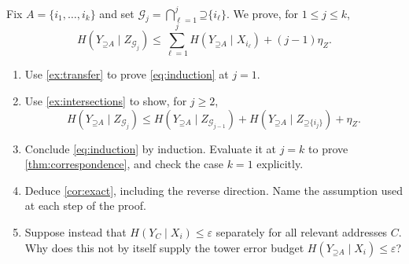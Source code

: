 \documentclass[11pt]{article}
\newcommand{\Up}{\mathord{\supseteq}}
\begin{document}
\begin{exercise}
\label{ex:induction}\important
Fix $A=\{i_1,\ldots,i_k\}$ and set
$\mathcal{G}_j=\bigcap_{\ell=1}^{j}\Up\{i_\ell\}$. We prove, for $1\le j\le k$,
\begin{equation}
 H(Y_{\Up A}\mid Z_{\mathcal{G}_j})\le
 \sum_{\ell=1}^{j}H(Y_{\Up A}\mid X_{i_\ell})+(j-1)\eta_Z.
 \label{eq:induction}
\end{equation}
\begin{enumerate}
\item Use \cref{ex:transfer} to prove \eqref{eq:induction} at $j=1$.
\item Use \cref{ex:intersections} to show, for $j\ge2$,
\[
 H(Y_{\Up A}\mid Z_{\mathcal{G}_j})\le
 H(Y_{\Up A}\mid Z_{\mathcal{G}_{j-1}})+H(Y_{\Up A}\mid Z_{\Up\{i_j\}})+\eta_Z.
\]
\item Conclude \eqref{eq:induction} by induction. Evaluate it at $j=k$ to
prove \cref{thm:correspondence}, and check the case $k=1$ explicitly.
\item Deduce \cref{cor:exact}, including the reverse direction. Name the
assumption used at each step of the proof.
\item Suppose instead that $H(Y_C\mid X_i)\le\varepsilon$ separately for
all relevant addresses $C$. Why does this not by itself supply the tower error
budget $H(Y_{\Up A}\mid X_i)\le\varepsilon$?
\end{enumerate}
\end{exercise}
\end{document}
